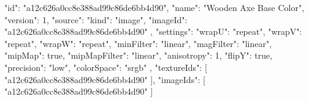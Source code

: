 {
  "id": "a12c626a0cc8e388ad99c86de6bb4d90",
  "name": "Wooden Axe Base Color",
  "version": 1,
  "source": {
    "kind": "image",
    "imageId": "a12c626a0cc8e388ad99c86de6bb4d90"
  },
  "settings": {
    "wrapU": "repeat",
    "wrapV": "repeat",
    "wrapW": "repeat",
    "minFilter": "linear",
    "magFilter": "linear",
    "mipMap": true,
    "mipMapFilter": "linear",
    "anisotropy": 1,
    "flipY": true,
    "precision": "low",
    "colorSpace": "srgb"
  },
  "textureIds": [
    "a12c626a0cc8e388ad99c86de6bb4d90"
  ],
  "imageIds": [
    "a12c626a0cc8e388ad99c86de6bb4d90"
  ]
}
